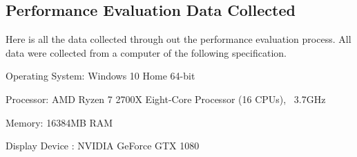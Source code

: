 \documentclass{l4proj}
\begin{document}
\begin{appendices}

\chapter{Performance Evaluation Data Collected}

Here is all the data collected through out the performance evaluation process. All data were collected from a computer of the following specification.

Operating System: Windows 10 Home 64-bit

Processor: AMD Ryzen 7 2700X Eight-Core Processor          (16 CPUs), ~3.7GHz

Memory: 16384MB RAM

Display Device : NVIDIA GeForce GTX 1080





\end{appendices}
\end{document}
